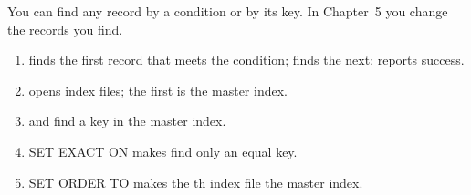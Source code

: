 You can find any record by a condition or by its key.  In Chapter~5 you change
the records you find.

\begin{enumerate}
\item {}  finds the first record that meets the
  condition;  finds the next;  reports success.
\item {}    opens index files; the
  first is the master index.
\item {}  and   find a key in the
  master index.
\item SET EXACT ON makes  find only an equal key.
\item SET ORDER TO  makes the th index file the master index.
\end{enumerate}
